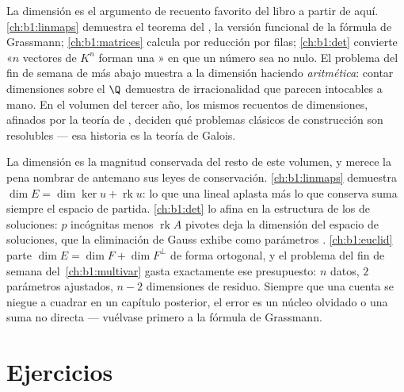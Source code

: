 \begin{remark}
\label{rem:b1:findim:whereused}
La dimensión es el argumento de recuento favorito del libro a partir
de aquí. \cref{ch:b1:linmaps} demuestra el teorema del , la
versión funcional de la fórmula de Grassmann;
\cref{ch:b1:matrices} calcula  por reducción por filas;
\cref{ch:b1:det} convierte «$n$ vectores de $K^n$ forman una »
en que un número sea no nulo. El problema del fin de semana de más
abajo muestra a la dimensión haciendo \emph{aritmética}: contar
dimensiones sobre el  $\Q$ demuestra  de
irracionalidad que parecen intocables a mano. En el volumen del
tercer año, los mismos recuentos de dimensiones, afinados por la
teoría de , deciden qué problemas clásicos de construcción son
resolubles --- esa historia es la teoría de Galois.
\end{remark}

\begin{remark}
\label{rem:b1:findim:perspectives}
La dimensión es la magnitud conservada del resto de este volumen, y
merece la pena nombrar de antemano sus leyes de conservación.
\cref{ch:b1:linmaps} demuestra
$\dim E = \dim\ker u + \operatorname{rk} u$: lo que una 
lineal aplasta más lo que conserva suma siempre el espacio de
partida. \cref{ch:b1:det} lo afina en la estructura de los
 de soluciones: $p$ incógnitas menos $\operatorname{rk} A$
pivotes deja la dimensión del espacio de soluciones, que la
eliminación de Gauss exhibe como parámetros .
\cref{ch:b1:euclid} parte $\dim E = \dim F + \dim F^\perp$ de forma
ortogonal, y el problema del fin de semana del~\cref{ch:b1:multivar}
gasta exactamente ese presupuesto: $n$ datos, $2$ parámetros
ajustados, $n - 2$ dimensiones de residuo. Siempre que una cuenta se
niegue a cuadrar en un capítulo posterior, el error es un núcleo
olvidado o una suma no directa --- vuélvase primero a la fórmula de
Grassmann.
\end{remark}

\section{Ejercicios}

